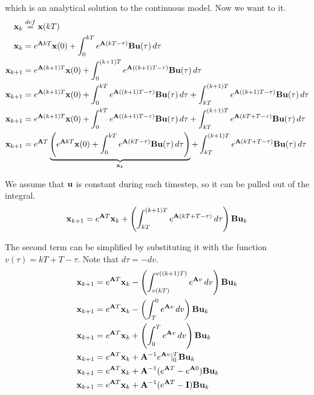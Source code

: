 which is an analytical solution to the continuous \gls{model}. Now we want to
 it.
\begin{align*}
  \mathbf{x}_k &\stackrel{def}{=} \mathbf{x}(kT) \\
  \mathbf{x}_k &= e^{\mathbf{A}kT}\mathbf{x}(0) +
    \int_0^{kT} e^{\mathbf{A}(kT - \tau)}\mathbf{B}\mathbf{u}(\tau) \,d\tau \\
  \mathbf{x}_{k+1} &= e^{\mathbf{A}(k + 1)T}\mathbf{x}(0) +
    \int_0^{(k + 1)T} e^{\mathbf{A}((k + 1)T - \tau)}\mathbf{B}\mathbf{u}(\tau) \,d\tau
    \\
  \mathbf{x}_{k+1} &= e^{\mathbf{A}(k + 1)T}\mathbf{x}(0) +
    \int_0^{kT} e^{\mathbf{A}((k + 1)T - \tau)}\mathbf{B}\mathbf{u}(\tau) \,d\tau +
    \int_{kT}^{(k + 1)T} e^{\mathbf{A}((k + 1)T - \tau)}\mathbf{B}\mathbf{u}(\tau)
    \,d\tau \\
  \mathbf{x}_{k+1} &= e^{\mathbf{A}(k + 1)T}\mathbf{x}(0) +
    \int_0^{kT} e^{\mathbf{A}((k + 1)T - \tau)}\mathbf{B}\mathbf{u}(\tau) \,d\tau +
    \int_{kT}^{(k + 1)T} e^{\mathbf{A}(kT + T - \tau)}\mathbf{B}\mathbf{u}(\tau) \,d\tau
    \\
  \mathbf{x}_{k+1} &= e^{\mathbf{A}T} \underbrace{\left(e^{\mathbf{A}kT}\mathbf{x}(0) +
    \int_0^{kT} e^{\mathbf{A}(kT - \tau)}\mathbf{B}\mathbf{u}(\tau)
    \,d\tau\right)}_{\mathbf{x}_k} +
    \int_{kT}^{(k + 1)T} e^{\mathbf{A}(kT + T - \tau)}\mathbf{B}\mathbf{u}(\tau) \,d\tau
\end{align*}

We assume that $\mathbf{u}$ is constant during each timestep, so it can be pulled
out of the integral.
\begin{equation*}
  \mathbf{x}_{k+1} = e^{\mathbf{A}T}\mathbf{x}_k +
    \left(\int_{kT}^{(k + 1)T} e^{\mathbf{A}(kT + T - \tau)} \,d\tau\right)
    \mathbf{B}\mathbf{u}_k
\end{equation*}

The second term can be simplified by substituting it with the function
$v(\tau) = kT + T - \tau$. Note that $d\tau = -dv$.
\begin{align*}
  \mathbf{x}_{k+1} &= e^{\mathbf{A}T}\mathbf{x}_k -
    \left(\int_{v(kT)}^{v((k + 1)T)} e^{\mathbf{A}v} \,dv\right)
    \mathbf{B}\mathbf{u}_k \\
  \mathbf{x}_{k+1} &= e^{\mathbf{A}T}\mathbf{x}_k -
    \left(\int_T^0 e^{\mathbf{A}v} \,dv\right) \mathbf{B}\mathbf{u}_k \\
  \mathbf{x}_{k+1} &= e^{\mathbf{A}T}\mathbf{x}_k +
    \left(\int_0^T e^{\mathbf{A}v} \,dv\right) \mathbf{B}\mathbf{u}_k \\
  \mathbf{x}_{k+1} &= e^{\mathbf{A}T}\mathbf{x}_k +
    \mathbf{A}^{-1}e^{\mathbf{A}v} \rvert_0^T \mathbf{B}\mathbf{u}_k \\
  \mathbf{x}_{k+1} &= e^{\mathbf{A}T}\mathbf{x}_k +
    \mathbf{A}^{-1}(e^{\mathbf{A}T} - e^{\mathbf{A}0}) \mathbf{B}\mathbf{u}_k \\
  \mathbf{x}_{k+1} &= e^{\mathbf{A}T}\mathbf{x}_k +
    \mathbf{A}^{-1}(e^{\mathbf{A}T} - \mathbf{I}) \mathbf{B}\mathbf{u}_k
\end{align*}

